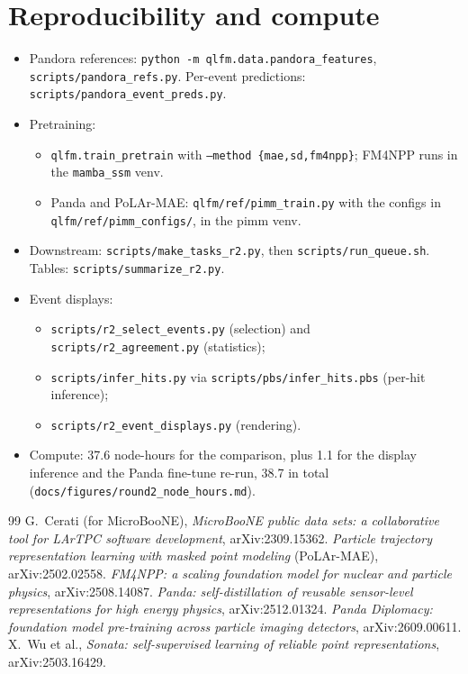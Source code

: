 \documentclass[11pt,a4paper]{article}
\newcommand{\code}[1]{\texttt{\small #1}}
\begin{document}
\section{Reproducibility and compute}
\sloppy
\begin{itemize}[leftmargin=*]
\item Pandora references: \code{python -m qlfm.data.pandora\_features}, \code{scripts/pandora\_refs.py}. Per-event predictions: \code{scripts/pandora\_event\_preds.py}.
\item Pretraining:
  \begin{itemize}
    \item \code{qlfm.train\_pretrain} with \code{--method \{mae,sd,fm4npp\}}; FM4NPP runs in the \code{mamba\_ssm} venv.
    \item Panda and PoLAr-MAE: \code{qlfm/ref/pimm\_train.py} with the configs in \code{qlfm/ref/pimm\_configs/}, in the pimm venv.
  \end{itemize}
\item Downstream: \code{scripts/make\_tasks\_r2.py}, then \code{scripts/run\_queue.sh}. Tables: \code{scripts/summarize\_r2.py}.
\item Event displays:
  \begin{itemize}
    \item \code{scripts/r2\_select\_events.py} (selection) and \code{scripts/r2\_agreement.py} (statistics);
    \item \code{scripts/infer\_hits.py} via \code{scripts/pbs/infer\_hits.pbs} (per-hit inference);
    \item \code{scripts/r2\_event\_displays.py} (rendering).
  \end{itemize}
\item Compute: 37.6 node-hours for the comparison, plus 1.1 for the display inference and the Panda fine-tune re-run, 38.7 in total (\code{docs/figures/round2\_node\_hours.md}).
\end{itemize}

\begin{thebibliography}{99}\small
{} G.~Cerati (for MicroBooNE), \emph{MicroBooNE public data sets: a collaborative tool for LArTPC software development}, arXiv:2309.15362.
 \emph{Particle trajectory representation learning with masked point modeling} (PoLAr-MAE), arXiv:2502.02558.
 \emph{FM4NPP: a scaling foundation model for nuclear and particle physics}, arXiv:2508.14087.
 \emph{Panda: self-distillation of reusable sensor-level representations for high energy physics}, arXiv:2512.01324.
 \emph{Panda Diplomacy: foundation model pre-training across particle imaging detectors}, arXiv:2609.00611.
 X.~Wu et al., \emph{Sonata: self-supervised learning of reliable point representations}, arXiv:2503.16429.
\end{thebibliography}
\end{document}
